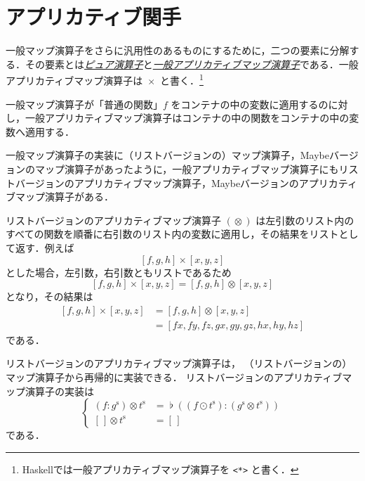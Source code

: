 \documentclass[a4paper,draft]{jsbook}
\newcommand{\programminglanguage}[1]{\textsf{#1}}
\newcommand{\haskell}{\programminglanguage{Haskell}}
\newcommand{\keyword}[1]{{\underline{\emph{#1}}}}
\newcommand{\code}[1]{\texttt{#1}}
\newcommand{\mListOf}[1]{\left[#1\right]}
\newcommand{\mListVar}[1]{{#1}^\mathrm{s}}
\DeclareMathOperator{\mMapList}{\odot}
\DeclareMathOperator{\mApplicativeMap}{\times}
\DeclareMathOperator{\mApplicativeMapList}{\otimes}
\newcommand{\mathEmptyList}{{[\,]}}
\DeclareMathOperator{\mathConcat}{\flat}
\newcommand{\mathApplicativeMap}{\mathbin{\otimes}}
\begin{document}
\section{アプリカティブ関手}

一般マップ演算子をさらに汎用性のあるものにするために，二つの要素に分解する．その要素とは\keyword{ピュア演算子}と\keyword{一般アプリカティブマップ演算子}である．一般アプリカティブマップ演算子は $\mApplicativeMap$ と書く．\footnote{\haskell では一般アプリカティブマップ演算子を \code{<*>} と書く．}

一般マップ演算子が「普通の関数」$f$ をコンテナの中の変数に適用するのに対し，一般アプリカティブマップ演算子はコンテナの中の関数をコンテナの中の変数へ適用する．

一般マップ演算子の実装に（リストバージョンの）マップ演算子，Maybeバージョンのマップ演算子があったように，一般アプリカティブマップ演算子にもリストバージョンのアプリカティブマップ演算子，Maybeバージョンのアプリカティブマップ演算子がある．

リストバージョンのアプリカティブマップ演算子 $(\mApplicativeMapList)$ は左引数のリスト内のすべての関数を順番に右引数のリスト内の変数に適用し，その結果をリストとして返す．例えば
\begin{equation}
\mListOf{f,g,h}\mApplicativeMap\mListOf{x,y,z}
\end{equation}
とした場合，左引数，右引数ともリストであるため
\begin{equation}
\mListOf{f,g,h}\mApplicativeMap\mListOf{x,y,z}
=\mListOf{f,g,h}\mApplicativeMapList\mListOf{x,y,z}
\end{equation}
となり，その結果は
\begin{align}
\mListOf{f,g,h}\mApplicativeMap\mListOf{x,y,z}
&=\mListOf{f,g,h}\mApplicativeMapList\mListOf{x,y,z}\\
&=\mListOf{fx,fy,fz,gx,gy,gz,hx,hy,hz}
\end{align}
である．

リストバージョンのアプリカティブマップ演算子は，
（リストバージョンの）マップ演算子から再帰的に実装できる．
リストバージョンのアプリカティブマップ演算子の実装は
\begin{equation}
\left\{
\begin{split}
(f:\mListVar{g})\mathApplicativeMap\mListVar{t}&=\mathConcat((f\mMapList\mListVar{t}):(\mListVar{g}\mathApplicativeMap\mListVar{t}))\\
\mathEmptyList\mathApplicativeMap\mListVar{t}&=\mathEmptyList
\end{split}
\right.
\end{equation}
である．
\end{document}
